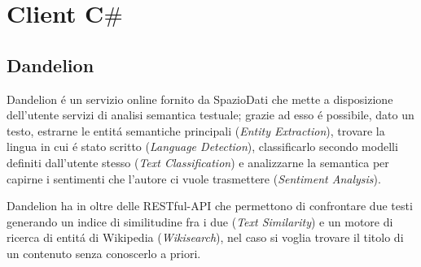 \chapter{Client C$\#$}

\section{Dandelion}
Dandelion \'e un servizio online fornito da SpazioDati che mette a disposizione dell'utente servizi di analisi semantica testuale; 
grazie ad esso \'e possibile, dato un testo, estrarne le entit\'a semantiche principali (\textit{Entity Extraction}), trovare la lingua in cui \'e stato 
scritto (\textit{Language Detection}), classificarlo secondo modelli definiti dall'utente stesso (\textit{Text Classification}) e analizzarne la semantica 
per capirne i sentimenti che l'autore ci vuole trasmettere (\textit{Sentiment Analysis}). 

Dandelion ha in oltre delle RESTful-API che permettono di confrontare due testi generando un indice di similitudine fra i due (\textit{Text Similarity}) e
un motore di ricerca di entit\'a di Wikipedia (\textit{Wikisearch}), nel caso si voglia trovare il titolo di un contenuto senza conoscerlo a priori.


